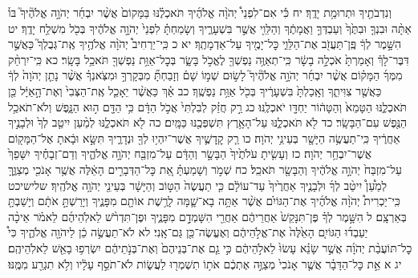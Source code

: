 \documentclass[twoside, openany, parskip=half, 11pt]{book}
\begin{document}
וְנִדְבֹתֶ֖יךָ וּתְרוּמַ֥ת יָדֶֽךָ׃ יח כִּ֡י אִם־לִפְנֵי֩ יְהֹוָ֨ה אֱלֹהֶ֜יךָ תֹּאכְלֶ֗נּוּ בַּמָּקוֹם֙ אֲשֶׁ֨ר יִבְחַ֜ר יְהֹוָ֣ה אֱלֹהֶ֘יךָ֮ בּוֹ֒ אַתָּ֨ה וּבִנְךָ֤ וּבִתֶּ֙ךָ֙ וְעַבְדְּךָ֣ וַאֲמָתֶ֔ךָ וְהַלֵּוִ֖י אֲשֶׁ֣ר בִּשְׁעָרֶ֑יךָ וְשָׂמַחְתָּ֗ לִפְנֵי֙ יְהֹוָ֣ה אֱלֹהֶ֔יךָ בְּכֹ֖ל מִשְׁלַ֥ח יָדֶֽךָ׃ יט הִשָּׁ֣מֶר לְךָ֔ פֶּֽן־תַּעֲזֹ֖ב אֶת־הַלֵּוִ֑י כׇּל־יָמֶ֖יךָ עַל־אַדְמָתֶֽךָ׃
יא כ כִּֽי־יַרְחִיב֩ יְהֹוָ֨ה אֱלֹהֶ֥יךָ אֶֽת־גְּבֻלְךָ֮ כַּאֲשֶׁ֣ר דִּבֶּר־לָךְ֒ וְאָמַרְתָּ֙ אֹכְלָ֣ה בָשָׂ֔ר כִּֽי־תְאַוֶּ֥ה נַפְשְׁךָ֖ לֶאֱכֹ֣ל בָּשָׂ֑ר בְּכׇל־אַוַּ֥ת נַפְשְׁךָ֖ תֹּאכַ֥ל בָּשָֽׂר׃ כא כִּֽי־יִרְחַ֨ק מִמְּךָ֜ הַמָּק֗וֹם אֲשֶׁ֨ר יִבְחַ֜ר יְהֹוָ֣ה אֱלֹהֶ֘יךָ֮ לָשׂ֣וּם שְׁמ֣וֹ שָׁם֒ וְזָבַחְתָּ֞ מִבְּקָרְךָ֣ וּמִצֹּֽאנְךָ֗ אֲשֶׁ֨ר נָתַ֤ן יְהֹוָה֙ לְךָ֔ כַּאֲשֶׁ֖ר צִוִּיתִ֑ךָ וְאָֽכַלְתָּ֙ בִּשְׁעָרֶ֔יךָ בְּכֹ֖ל אַוַּ֥ת נַפְשֶֽׁךָ׃ כב אַ֗ךְ כַּאֲשֶׁ֨ר יֵאָכֵ֤ל אֶֽת־הַצְּבִי֙ וְאֶת־הָ֣אַיָּ֔ל כֵּ֖ן תֹּאכְלֶ֑נּוּ הַטָּמֵא֙ וְהַטָּה֔וֹר יַחְדָּ֖ו יֹאכְלֶֽנּוּ׃ כג רַ֣ק חֲזַ֗ק לְבִלְתִּי֙ אֲכֹ֣ל הַדָּ֔ם כִּ֥י הַדָּ֖ם ה֣וּא הַנָּ֑פֶשׁ וְלֹא־תֹאכַ֥ל הַנֶּ֖פֶשׁ עִם־הַבָּשָֽׂר׃ כד לֹ֖א תֹּאכְלֶ֑נּוּ עַל־הָאָ֥רֶץ תִּשְׁפְּכֶ֖נּוּ כַּמָּֽיִם׃ כה לֹ֖א תֹּאכְלֶ֑נּוּ לְמַ֨עַן יִיטַ֤ב לְךָ֙ וּלְבָנֶ֣יךָ אַחֲרֶ֔יךָ כִּֽי־תַעֲשֶׂ֥ה הַיָּשָׁ֖ר בְּעֵינֵ֥י יְהֹוָה׃ כו רַ֧ק קׇֽדָשֶׁ֛יךָ אֲשֶׁר־יִהְי֥וּ לְךָ֖ וּנְדָרֶ֑יךָ תִּשָּׂ֣א וּבָ֔אתָ אֶל־הַמָּק֖וֹם אֲשֶׁר־יִבְחַ֥ר יְהֹוָה׃ כז וְעָשִׂ֤יתָ עֹלֹתֶ֙יךָ֙ הַבָּשָׂ֣ר וְהַדָּ֔ם עַל־מִזְבַּ֖ח יְהֹוָ֣ה אֱלֹהֶ֑יךָ וְדַם־זְבָחֶ֗יךָ יִשָּׁפֵךְ֙ עַל־מִזְבַּח֙ יְהֹוָ֣ה אֱלֹהֶ֔יךָ וְהַבָּשָׂ֖ר תֹּאכֵֽל׃ כח שְׁמֹ֣ר וְשָׁמַעְתָּ֗ אֵ֚ת כׇּל־הַדְּבָרִ֣ים הָאֵ֔לֶּה אֲשֶׁ֥ר אָנֹכִ֖י מְצַוֶּ֑ךָּ לְמַ֩עַן֩ יִיטַ֨ב לְךָ֜ וּלְבָנֶ֤יךָ אַחֲרֶ֙יךָ֙ עַד־עוֹלָ֔ם כִּ֤י תַעֲשֶׂה֙ הַטּ֣וֹב וְהַיָּשָׁ֔ר בְּעֵינֵ֖י יְהֹוָ֥ה אֱלֹהֶֽיךָ׃
שלישיכט כִּֽי־יַכְרִית֩ יְהֹוָ֨ה אֱלֹהֶ֜יךָ אֶת־הַגּוֹיִ֗ם אֲשֶׁ֨ר אַתָּ֥ה בָא־שָׁ֛מָּה לָרֶ֥שֶׁת אוֹתָ֖ם מִפָּנֶ֑יךָ וְיָרַשְׁתָּ֣ אֹתָ֔ם וְיָשַׁבְתָּ֖ בְּאַרְצָֽם׃ ל הִשָּׁ֣מֶר לְךָ֗ פֶּן־תִּנָּקֵשׁ֙ אַחֲרֵיהֶ֔ם אַחֲרֵ֖י הִשָּׁמְדָ֣ם מִפָּנֶ֑יךָ וּפֶן־תִּדְרֹ֨שׁ לֵאלֹֽהֵיהֶ֜ם לֵאמֹ֗ר אֵיכָ֨ה יַעַבְד֜וּ הַגּוֹיִ֤ם הָאֵ֙לֶּה֙ אֶת־אֱלֹ֣הֵיהֶ֔ם וְאֶעֱשֶׂה־כֵּ֖ן גַּם־אָֽנִי׃ לא לֹא־תַעֲשֶׂ֣ה כֵ֔ן לַיהֹוָ֖ה אֱלֹהֶ֑יךָ כִּי֩ כׇל־תּוֹעֲבַ֨ת יְהֹוָ֜ה אֲשֶׁ֣ר שָׂנֵ֗א עָשׂוּ֙ לֵאלֹ֣הֵיהֶ֔ם כִּ֣י גַ֤ם אֶת־בְּנֵיהֶם֙ וְאֶת־בְּנֹ֣תֵיהֶ֔ם יִשְׂרְפ֥וּ בָאֵ֖שׁ לֵאלֹֽהֵיהֶֽם׃ יג א אֵ֣ת כׇּל־הַדָּבָ֗ר אֲשֶׁ֤ר אָנֹכִי֙ מְצַוֶּ֣ה אֶתְכֶ֔ם אֹת֥וֹ תִשְׁמְר֖וּ לַעֲשׂ֑וֹת לֹא־תֹסֵ֣ף עָלָ֔יו וְלֹ֥א תִגְרַ֖ע מִמֶּֽנּוּ׃
\end{document}
